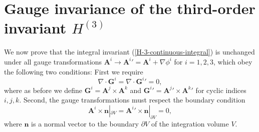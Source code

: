 \documentclass[10pt]{iopart}
\def \p{{\partial}}
\def \bA{{\mathbf{A}}}
\def \bG{{\mathbf{G}}}
\def \bn{{\mathbf{n}}}
\begin{document}
\section{Gauge invariance of the third-order invariant $H^{(3)}$}
\label{appendix-H-3-gauge-invariance}
We now prove that the
integral invariant (\ref{H-3-continuous-integral}) is unchanged under 
all gauge transformations
$\bA^i \rightarrow {\bA^i}' = \bA^i + \nabla\phi^i$ for $i=1,2,3$,
which obey the following two conditions:
First we require
\begin{equation}
   \nabla\cdot\bG^i = \nabla\cdot{\bG^i}' = 0, \label{gauge-condition-1}
\end{equation}
where as before we define
$\bG^i = \bA^j \times\bA^k$ and ${\bG^i}' = {\bA^j}' \times{\bA^k}'$
for cyclic indices $i,j,k$.
Second, the gauge transformations must respect the boundary condition
\begin{equation}
   \bA^i \times \bn|_{\p V} = {\bA^i}' \times \bn|_{\p V} = 0, 
                                                \label{gauge-condition-2}
\end{equation}
where $\bn$ is a normal vector to the boundary $\p V$ of the
integration volume $V$.
\end{document}
